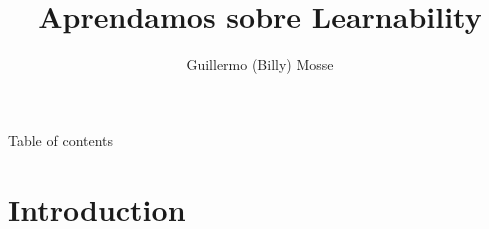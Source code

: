 \documentclass[10pt]{beamer}
\title{Aprendamos sobre Learnability}
\date{}
\author{Guillermo (Billy) Mosse}
\begin{document}
\maketitle

\begin{frame}{Table of contents}
  \tableofcontents[hideallsubsections]
\end{frame}

\section{Introduction}
\end{document}
